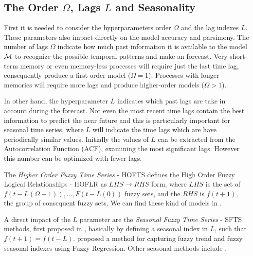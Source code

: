 %
\subsection{The Order $\Omega$, Lags $L$ and Seasonality}
\label{sec:fts_order}

First it is needed to consider the hyperparameters order $\Omega$ and the lag indexes $L$. These parameters also impact directly on the model accuracy and parsimony. The number of lags $\Omega$ indicate how much past information it is available to the model $\mathcal{M}$ to recognize the possible temporal patterns and make an forecast. Very short-term memory or even memory-less processes will require just the last time lag, consequently produce a first order model ($\Omega = 1$). Processes with longer memories will require more lags and produce higher-order models ($\Omega>1$). 

In other hand, the hyperparameter $L$ indicates which past lags are take in account during the forecast. Not even the most recent time lags contain the best information to predict the near future and this is particularly important for seasonal time series, where $L$ will indicate the time lags which are have periodically similar values. Initially the values of $L$ can be extracted from the Autocorrelation Function (ACF), examining the most significant lags. However this number can be optimized with fewer lags.


The \textit{Higher Order Fuzzy Time Series} - HOFTS  defines the High Order Fuzzy Logical Relationships - HOFLR as $LHS \rightarrow RHS$ form, where $LHS$ is the set of $f(t-L(\Omega-1)), ..., F(t - L(0))$ fuzzy sets, and the $RHS$ is $f(t+1)$, the group of consequent fuzzy sets. We can find these kind of models in \cite{Chen2002, Chen2006a, Jilani2008a, Li2008b, Egrioglu2010, Bahrepour2011, Huang2011, Enayatifar2013, Chen2014, Chen2015a, Ye2016, Lee2017, Bose2017, Jilang2017, Sadaei2017, Guney2018, Cheng2018, Yang2018, Zhang2018a}.

A direct impact of the $L$ parameter are the  \textit{Seasonal Fuzzy Time Series} - SFTS methods, first proposed  in \cite{Song1997}, basically by defining a seasonal index in $L$, such that $f(t+1) = f(t-L)$. \cite{Chang1997} proposed a method for capturing fuzzy trend and fuzzy seasonal indexes using Fuzzy Regression. Other seasonal methods include \cite{Tseng1999, Song1999, Lee2011}. 

